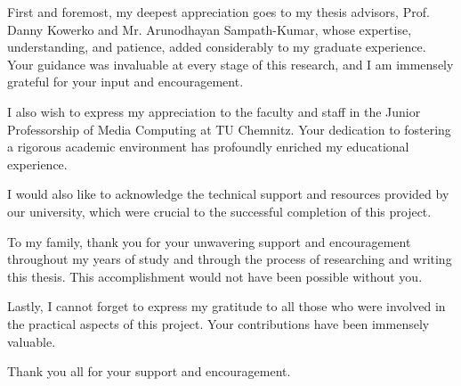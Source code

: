 First and foremost, my deepest appreciation goes to my thesis advisors, Prof. Danny Kowerko and Mr. Arunodhayan Sampath-Kumar, whose expertise, understanding, and patience, added considerably to my graduate experience. Your guidance was invaluable at every stage of this research, and I am immensely grateful for your input and encouragement.

I also wish to express my appreciation to the faculty and staff in the Junior Professorship of Media Computing at TU Chemnitz. Your dedication to fostering a rigorous academic environment has profoundly enriched my educational experience.

I would also like to acknowledge the technical support and resources provided by our university, which were crucial to the successful completion of this project.

To my family, thank you for your unwavering support and encouragement throughout my years of study and through the process of researching and writing this thesis. This accomplishment would not have been possible without you.

Lastly, I cannot forget to express my gratitude to all those who were involved in the practical aspects of this project. Your contributions have been immensely valuable.

Thank you all for your support and encouragement.

\let\cleardoublepage\cleardoubleemptypage

